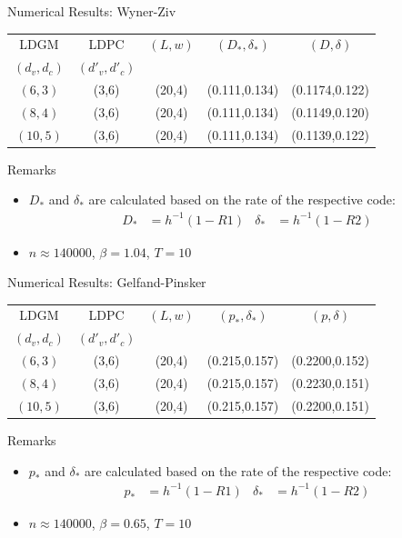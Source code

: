 \documentclass[10pt,presentation]{beamer}
\begin{document}
\begin{frame}{Numerical Results: Wyner-Ziv}
  \begin{center}
    \begin{tabular}{|c|c|c|c|c|}
      \hline
      LDGM & LDPC & $(L,w)$ & $(D_{*},\delta_{*})$ & $(D,\delta)$ \\
      $(d_v,d_c)$ & $(d'_v,d'_c)$ &  &  & \\
      \hline
      $(6,3)$ & (3,6) & (20,4)  & (0.111,0.134)  & (0.1174,0.122) \\
      $(8,4)$ & (3,6) & (20,4)  & (0.111,0.134)  & (0.1149,0.120) \\
      $(10,5)$ & (3,6) & (20,4)  & (0.111,0.134)  & (0.1139,0.122) \\
      \hline  
    \end{tabular}
  \end{center}
  \begin{block}{Remarks}
    \begin{itemize}
    \item $D_*$ and $\delta_*$ are calculated based on the rate of the respective code:
      \begin{align*}
        D_*&=h^{-1}(1-R1)  & \delta_*&=h^{-1}(1-R2)
      \end{align*}
    \item $n\approx 140000$, $\beta=1.04$, $T=10$
    \end{itemize}
  \end{block}
\end{frame}

\begin{frame}{Numerical Results: Gelfand-Pinsker}
  \begin{center}
    \begin{tabular}{|c|c|c|c|c|}
      \hline
      LDGM & LDPC & $(L,w)$ & $(p_{*},\delta_{*})$ & $(p,\delta)$ \\
      $(d_v,d_c)$ & $(d'_v,d'_c)$ &  &  & \\
      \hline
      $(6,3)$ & (3,6) & (20,4)  & (0.215,0.157)  & (0.2200,0.152) \\
      $(8,4)$ & (3,6) & (20,4)  & (0.215,0.157)  & (0.2230,0.151) \\
      $(10,5)$ & (3,6) & (20,4)  & (0.215,0.157)  & (0.2200,0.151) \\
      \hline
    \end{tabular}
  \end{center}
  \begin{block}{Remarks}
    \begin{itemize}
    \item $p_*$ and $\delta_*$ are calculated based on the rate of the respective code:
      \begin{align*}
        p_*&=h^{-1}(1-R1)  & \delta_*&=h^{-1}(1-R2)
      \end{align*}
    \item $n\approx 140000$, $\beta=0.65$, $T=10$
    \end{itemize}
  \end{block}
\end{frame}
\end{document}
